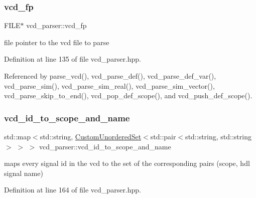\mbox{\label{classvcd__parser_aa351a83f30a9cb117d73f08f75928950}} 
\subsubsection{\texorpdfstring{vcd\+\_\+fp}{vcd\_fp}}
{\footnotesize\ttfamily F\+I\+LE$\ast$ vcd\+\_\+parser\+::vcd\+\_\+fp\hspace{0.3cm}{\ttfamily [private]}}



file pointer to the vcd file to parse 



Definition at line 135 of file vcd\+\_\+parser.\+hpp.



Referenced by parse\+\_\+vcd(), vcd\+\_\+parse\+\_\+def(), vcd\+\_\+parse\+\_\+def\+\_\+var(), vcd\+\_\+parse\+\_\+sim(), vcd\+\_\+parse\+\_\+sim\+\_\+real(), vcd\+\_\+parse\+\_\+sim\+\_\+vector(), vcd\+\_\+parse\+\_\+skip\+\_\+to\+\_\+end(), vcd\+\_\+pop\+\_\+def\+\_\+scope(), and vcd\+\_\+push\+\_\+def\+\_\+scope().

\mbox{\label{classvcd__parser_aa85bc91897a99c588fb56c54a05fc359}} 
\subsubsection{\texorpdfstring{vcd\+\_\+id\+\_\+to\+\_\+scope\+\_\+and\+\_\+name}{vcd\_id\_to\_scope\_and\_name}}
{\footnotesize\ttfamily std\+::map$<$std\+::string, \hyperlink{classCustomUnorderedSet}{Custom\+Unordered\+Set}$<$std\+::pair$<$std\+::string, std\+::string$>$ $>$ $>$ vcd\+\_\+parser\+::vcd\+\_\+id\+\_\+to\+\_\+scope\+\_\+and\+\_\+name\hspace{0.3cm}{\ttfamily [private]}}



maps every signal id in the vcd to the set of the corresponding pairs (scope, hdl signal name) 



Definition at line 164 of file vcd\+\_\+parser.\+hpp.



